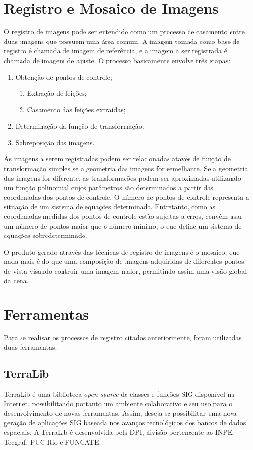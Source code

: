 \documentclass[9pt, a4paper, nofonttune, journal]{IEEEtran}
\begin{document}
\section{Registro e Mosaico de Imagens}
O registro de imagens pode ser entendido como um processo de casamento entre duas imagens que possuem uma área comum.
A imagem tomada como base de registro é chamada de imagem de referência, e a imagem a ser registrada é chamada de imagem de ajuste.
O processo basicamente envolve três etapas:
\begin{enumerate}
	\item Obtenção de pontos de controle;
	\begin{enumerate}
		\item Extração de feições;
		\item Casamento das feições extraídas;
	\end{enumerate}
	\item Determinação da função de transformação;
	\item Sobreposição das imagens.
\end{enumerate}

As imagens a serem registradas podem ser relacionadas atavés de função de transformação simples se a geometria das imagens for semelhante.
Se a geometria das imagens for diferente, as transformações podem ser aproximadas utilizando um função polinomial cujos parâmetros são determinados 
a partir das coordenadas dos pontos de controle.
O número de pontos de controle representa a situação de um sistema de equações determinado.
Entretanto, como as coordenadas medidas dos pontos de controle estão sujeitas a erros, convém usar um número de pontos maior que o número mínimo,
o que define um sistema de equações sobredeterminado.

O produto gerado através das técnicas de registro de imagens é o mosaico, que nada mais é do que uma 
composição de imagens adquiridas de diferentes pontos de vista visando contruir uma imagem maior, permitindo assim uma visão global da cena.\cite{Fedorov1}

\section{Ferramentas}
Para se realizar os processos de registro citados anteriormente, foram utilizadas duas ferramentas.

\subsection{TerraLib}
TerraLib é uma biblioteca \textit{open source} de classes e funções SIG disponível na Internet, possibilitando portanto um ambiente colaborativo e seu uso
para o desenvolvimento de novas ferramentas. Assim, deseja-se possibilitar uma nova geração de aplicações SIG baseada nos avanços tecnológicos dos bancos de dados espaciais.
A TerraLib é desenvolvida pela DPI, divisão pertencente ao INPE, Tecgraf, PUC-Rio e FUNCATE.\cite{Terralib1}
\end{document}
